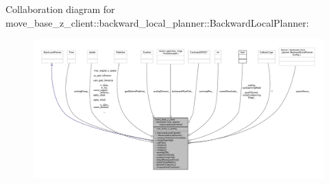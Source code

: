 Collaboration diagram for move\+\_\+base\+\_\+z\+\_\+client\+:\+:backward\+\_\+local\+\_\+planner\+:\+:Backward\+Local\+Planner\+:\nopagebreak
\begin{figure}[H]
\begin{center}
\leavevmode
\includegraphics[width=350pt]{classmove__base__z__client_1_1backward__local__planner_1_1BackwardLocalPlanner__coll__graph}
\end{center}
\end{figure}
